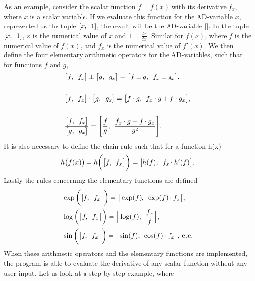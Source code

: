 As an example, consider the scalar function $f = f(x)$ with its derivative $f_x$, where $x$ is a scalar variable. If we evaluate this function for the AD-variable $x$, represented as the tuple $[x,\hspace{0.5em}1]$, the result will be the AD-variable []. In the tuple $[x,\hspace{0.5em}1]$, $x$ is the numerical value of $x$ and $1 = \frac{dx}{dx}$. Similar for $f(x)$, where $f$ is the numerical value of $f(x)$, and $f_x$ is the numerical value of $f'(x)$.  We then define the four elementary arithmetic operators for the AD-variables, such that for functions $f$ and $g$,
\begin{equation}
    \begin{aligned}
    &\big[f,\hspace{0.5em}f_x\big] \pm \big[g,\hspace{0.5em}g_x   \big] = \big[f \pm g,\hspace{0.5em}f_x \pm g_x \big] ,\\\\
    &\big[  f,\hspace{0.5em}f_x   \big]\cdot \big[  g,\hspace{0.5em}g_x   \big] = \big[  f\cdot g,\hspace{0.5em}f_x\cdot g + f\cdot g_x   \big],\\\\
    &\frac{\big[ f,\hspace{0.5em}f_x   \big]}{\big[  g,\hspace{0.5em}g_x   \big]} = \Bigg[  \frac{f}{g},\hspace{0.5em}\frac{f_x\cdot g - f\cdot g_x}{g^2}\Bigg].
\end{aligned}
\label{eq:arithmeticOperators}
\end{equation}
It is also necessary to define the chain rule such that for a function h(x)
\begin{equation*}
h\big(f(x)\big) = h\bigg(\big[ f ,\hspace{0.5em}f_x  \big]\bigg) = \big[ h(f),\hspace{0.5em} f_x\cdot h'(f) \big].
\end{equation*}
Lastly the rules concerning the elementary functions are defined
\begin{equation}
    \begin{aligned}
        &\exp\bigg(\big[ f,\hspace{0.5em}f_x  \big]\bigg) =  \big[ \exp(f),\hspace{0.5em}\exp(f)\cdot f_x  \big],\\
        &\log\bigg(\big[ f,\hspace{0.5em}f_x  \big]\bigg) =  \Big[  \log(f),\hspace{0.5em}\frac{f_x}{f}   \Big],\\
        &\sin\bigg(\big[  f,\hspace{0.5em}f_x   \big]\bigg) =  \big[  \sin(f),\hspace{0.5em}\cos(f)\cdot f_x   \big]\text{,  etc.}
    \end{aligned}
\label{eq:elementaryFunctions}
\end{equation}
When these arithmetic operators and the elementary functions are implemented, the program is able to evaluate the derivative of any scalar function without any user input. Let us look at a step by step example, where 
